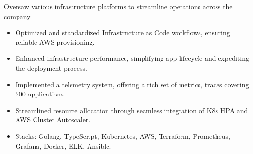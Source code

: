 \documentclass{resume}
\begin{document}
Oversaw various infrastructure platforms to streamline operations across the company
\begin{itemize}
  \item Optimized and standardized Infrastructure as Code workflows, ensuring reliable AWS provisioning.
  \item Enhanced infrastructure performance, simplifying app lifecycle and expediting the deployment process.
  \item Implemented a telemetry system, offering a rich set of metrics, traces covering 200 applications.
  \item Streamlined resource allocation through seamless integration of K8s HPA and AWS Cluster Autoscaler.
  \item Stacks: Golang, TypeScript, Kubernetes, AWS, Terraform, Prometheus, Grafana, Docker, ELK, Ansible.
\end{itemize}

\end{document}
